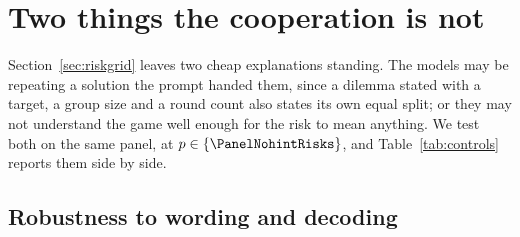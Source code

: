 
\section{Two things the cooperation is not}
\label{sec:controls}

Section~\ref{sec:riskgrid} leaves two cheap explanations standing. The models may be
repeating a solution the prompt handed them, since a dilemma stated with a target, a group
size and a round count also states its own equal split; or they may not understand the game
well enough for the risk to mean anything. We test both on the same panel, at
$p\in\{\PanelNohintRisks\}$, and Table~\ref{tab:controls} reports them side by side.



\subsection{Robustness to wording and decoding}
\label{sec:e6}

